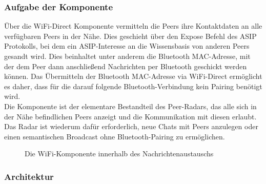 \subsubsection{Aufgabe der Komponente}
Über die WiFi-Direct Komponente vermitteln die Peers ihre Kontaktdaten an alle ver\-füg\-ba\-ren Peers in der Nähe. Dies geschieht über den Expose Befehl des ASIP Protokolls, bei dem ein ASIP-Interesse an die Wissensbasis von anderen Peers gesandt wird. Dies beinhaltet unter anderem die Bluetooth MAC-Adresse, mit der dem Peer dann anschließend Nachrichten per Bluetooth geschickt werden können. Das Übermitteln der Bluetooth MAC-Adresse via WiFi-Direct ermöglicht es daher, dass für die darauf folgende Bluetooth-Verbindung kein Pairing benötigt wird. 
\\Die Komponente ist der elementare Bestandteil des Peer-Radars, das alle sich in der Nähe befindlichen Peers anzeigt und die Kommunikation mit diesen erlaubt. Das Radar ist wiederum dafür erforderlich, neue Chats mit Peers anzulegen oder einen semantischen Broadcast ohne Bluetooth-Pairing zu ermöglichen.
\begin{figure}[H]
	\centering
	\caption{Die WiFi-Komponente innerhalb des Nachrichtenaustauschs}
	\label{fig:wifiComp}
\end{figure}
\newpage
\subsubsection{Architektur}

